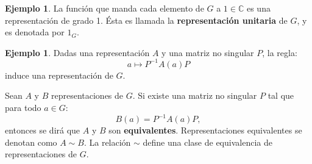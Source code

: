 \documentclass[12pt]{book}
\theoremstyle{definition}
\newtheorem{example}[theorem]{Ejemplo}
\newcounter{in}
\begin{document}
\begin{example}
  \label{Ej6}
  La función que manda cada elemento de $G$ a $1
  \in \mathbb{C}$ es una representación de grado 1. Ésta es llamada la
  \textbf{representación unitaria} de $G$, y es denotada por $1_{G}$. 
\end{example}
\begin{example}
  \label{Ej5}
  Dadas una representación $A$ y una matriz no singular $P$, la regla:
  \begin{equation*}
    a \mapsto P^{-1}A\left(a\right)P
  \end{equation*}  
  induce una representación de $G$.

  Sean $A$ y $B$ representaciones de $G$. Si existe una
  matriz no singular $P$ tal que para todo $a \in G$:
  \begin{equation*}
    B\left(a\right)= P^{-1}A\left(a\right)P,
  \end{equation*}
  entonces se dirá que $A$ y $B$ son
  \textbf{equivalentes}. Representaciones equivalentes se denotan como
  $A \sim B$. La relación $\sim$ define una clase de equivalencia de
  representaciones de $G$.
\end{example}
\end{document}
